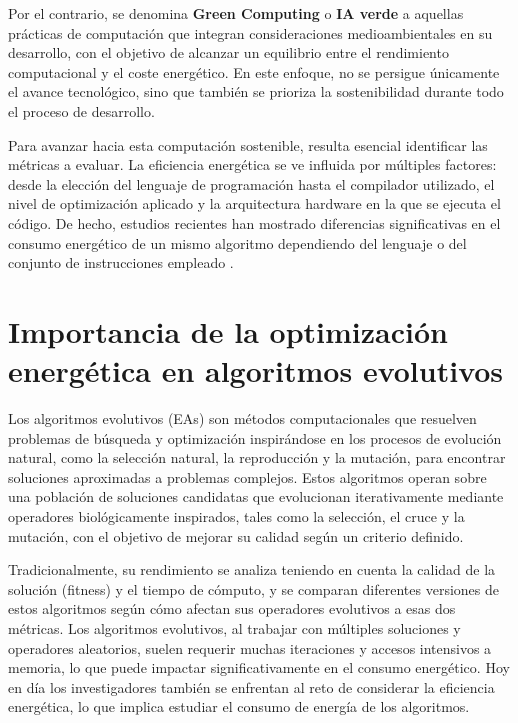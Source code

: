 Por el contrario, se denomina \textbf{Green Computing} o \textbf{IA verde} a aquellas prácticas de computación que integran consideraciones medioambientales en su desarrollo, con el objetivo de alcanzar un equilibrio entre el rendimiento computacional y el coste energético. En este enfoque, no se persigue únicamente el avance tecnológico, sino que también se prioriza la sostenibilidad durante todo el proceso de desarrollo. \cite{zhou2023opportunities}

Para avanzar hacia esta computación sostenible, resulta esencial identificar las métricas a evaluar. La eficiencia energética se ve influida por múltiples factores: desde la elección del lenguaje de programación hasta el compilador utilizado, el nivel de optimización aplicado y la arquitectura hardware en la que se ejecuta el código. De hecho, estudios recientes han mostrado diferencias significativas en el consumo energético de un mismo algoritmo dependiendo del lenguaje o del conjunto de instrucciones empleado \cite{lutz2021energy}.

\section{Importancia de la optimización energética en algoritmos evolutivos}

Los algoritmos evolutivos (EAs) son métodos computacionales que resuelven problemas de búsqueda y optimización inspirándose en los procesos de evolución natural, como la selección natural, la reproducción y la mutación, para encontrar soluciones aproximadas a problemas complejos. Estos algoritmos operan sobre una población de soluciones candidatas que evolucionan iterativamente mediante operadores biológicamente inspirados, tales como la selección, el cruce y la mutación, con el objetivo de mejorar su calidad según un criterio definido.

Tradicionalmente, su rendimiento se analiza teniendo en cuenta la calidad de la solución (fitness) y el tiempo de cómputo, y se comparan diferentes versiones de estos algoritmos según cómo afectan sus operadores evolutivos a esas dos métricas. Los algoritmos evolutivos, al trabajar con múltiples soluciones y operadores aleatorios, suelen requerir muchas iteraciones y accesos intensivos a memoria, lo que puede impactar significativamente en el consumo energético. Hoy en día los investigadores también se enfrentan al reto de considerar la eficiencia energética, lo que implica estudiar el consumo de energía de los algoritmos.

